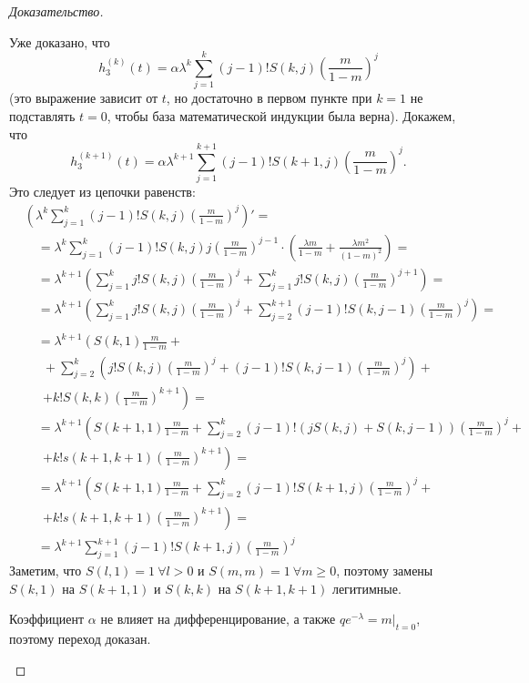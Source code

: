 \documentclass[12pt, specialist, subf, substylefile = spbu_report.rtx]{disser}
\begin{document}
\begin{proof}[Доказательство]
\begin{enumerate}
			Уже доказано, что
			\[
				h _3 ^{(k)} (t) = \alpha \lambda ^k \sum \limits _{j = 1} ^{k} (j - 1)! S(k, j) \left(\frac m {1 - m}\right) ^j
			\]
			(это выражение зависит от $t$, но достаточно в первом пункте при $k = 1$ не подставлять $t = 0$, чтобы база математической индукции была верна). Докажем, что
			\[
				h _3 ^{(k + 1)} (t) = \alpha \lambda ^{k + 1} \sum \limits _{j = 1} ^{k + 1} (j - 1)! S(k + 1, j) \left(\frac m {1 - m}\right) ^j.
			\]
			Это следует из цепочки равенств:
			\[
				\begin{aligned}
					&\left(\lambda ^k \sum \limits _{j = 1} ^{k} (j - 1)! S(k, j) \left(\frac m {1 - m}\right) ^j\right)' =\\
					&\quad= \lambda ^k \sum \limits _{j = 1} ^{k} (j - 1)! S(k, j) j \left(\frac m {1 - m}\right) ^{j - 1} \cdot \left(\frac {\lambda m} {1 - m} + \frac {\lambda m ^2} {(1 - m) ^2}\right) =\\
					&\quad= \lambda ^{k + 1} \left(\sum \limits _{j = 1} ^{k} j! S(k, j) \left(\frac m {1 - m}\right) ^j + \sum \limits _{j = 1} ^{k} j! S(k, j) \left(\frac m {1 - m}\right) ^{j + 1}\right) =\\
					&\quad= \lambda ^{k + 1} \left(\sum \limits _{j = 1} ^{k} j! S(k, j) \left(\frac m {1 - m}\right) ^j + \sum \limits _{j = 2} ^{k + 1} (j - 1)! S(k, j - 1) \left(\frac m {1 - m}\right) ^j\right) =\\
				\end{aligned}
			\]
			\[
				\begin{aligned}
					&\quad= \lambda ^{k + 1} \left(S(k, 1) \frac m {1 - m} +\right.\\
					&\quad~~ + \sum \limits _{j = 2} ^{k} \left(j! S(k, j) \left(\frac m {1 - m}\right) ^j + (j - 1)! S(k, j - 1) \left(\frac m {1 - m}\right) ^j\right) +\\
					&\quad~~ \left.+ k ! S (k, k) \left(\frac m {1 - m}\right) ^{k + 1}\right) =\\
					&\quad= \lambda ^{k + 1} \left(S(k + 1, 1) \frac m {1 - m} + \sum \limits _{j = 2} ^{k} (j - 1)! \left(j S(k, j) + S(k, j - 1)\right) \left(\frac m {1 - m}\right) ^j +\right.\\
					&\quad~~\left.+ k ! s (k + 1, k + 1) \left(\frac m {1 - m}\right) ^{k + 1}\right) =\\
					&\quad= \lambda ^{k + 1} \left(S(k + 1, 1) \frac m {1 - m} + \sum \limits _{j = 2} ^{k} (j - 1)! S(k + 1, j) \left(\frac m {1 - m}\right) ^j +\right.\\
					&\quad~~\left.+ k ! s (k + 1, k + 1) \left(\frac m {1 - m}\right) ^{k + 1}\right) =\\
					&\quad=\lambda ^{k + 1} \sum \limits _{j = 1} ^{k + 1} (j - 1)! S(k + 1, j) \left(\frac m {1 - m}\right) ^j
				\end{aligned}
			\]
			Заметим, что $S(l, 1) = 1~ \forall l > 0$ и $S(m, m) = 1~ \forall m \geqslant 0$, поэтому замены $S(k, 1)$ на $S(k + 1, 1)$ и $S(k, k)$ на $S(k + 1, k + 1)$ легитимные.
			
			Коэффициент $\alpha$ не влияет на дифференцирование, а также $q e ^{-\lambda} = m | _{t = 0}$, поэтому переход доказан.
		\end{enumerate}
	\end{proof}
\end{document}
